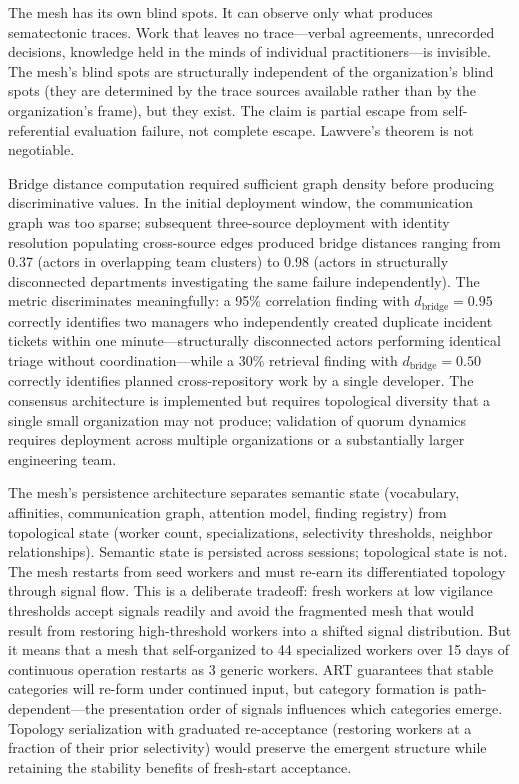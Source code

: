\documentclass[11pt,a4paper]{article}
\begin{document}
The mesh has its own blind spots. It can observe only what produces sematectonic traces. Work that leaves no trace---verbal agreements, unrecorded decisions, knowledge held in the minds of individual practitioners---is invisible. The mesh's blind spots are structurally independent of the organization's blind spots (they are determined by the trace sources available rather than by the organization's frame), but they exist. The claim is partial escape from self-referential evaluation failure, not complete escape. Lawvere's theorem is not negotiable.

Bridge distance computation required sufficient graph density before producing discriminative values. In the initial deployment window, the communication graph was too sparse; subsequent three-source deployment with identity resolution populating cross-source edges produced bridge distances ranging from 0.37 (actors in overlapping team clusters) to 0.98 (actors in structurally disconnected departments investigating the same failure independently). The metric discriminates meaningfully: a 95\% correlation finding with $d_{\text{bridge}} = 0.95$ correctly identifies two managers who independently created duplicate incident tickets within one minute---structurally disconnected actors performing identical triage without coordination---while a 30\% retrieval finding with $d_{\text{bridge}} = 0.50$ correctly identifies planned cross-repository work by a single developer. The consensus architecture is implemented but requires topological diversity that a single small organization may not produce; validation of quorum dynamics requires deployment across multiple organizations or a substantially larger engineering team.

The mesh's persistence architecture separates semantic state (vocabulary, affinities, communication graph, attention model, finding registry) from topological state (worker count, specializations, selectivity thresholds, neighbor relationships). Semantic state is persisted across sessions; topological state is not. The mesh restarts from seed workers and must re-earn its differentiated topology through signal flow. This is a deliberate tradeoff: fresh workers at low vigilance thresholds accept signals readily and avoid the fragmented mesh that would result from restoring high-threshold workers into a shifted signal distribution. But it means that a mesh that self-organized to 44 specialized workers over 15 days of continuous operation restarts as 3 generic workers. ART guarantees that stable categories will re-form under continued input, but category formation is path-dependent---the presentation order of signals influences which categories emerge. Topology serialization with graduated re-acceptance (restoring workers at a fraction of their prior selectivity) would preserve the emergent structure while retaining the stability benefits of fresh-start acceptance.
\end{document}
